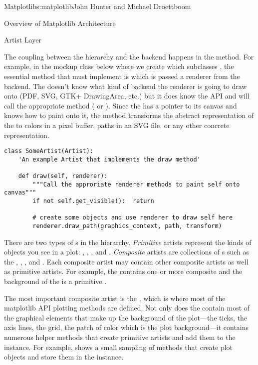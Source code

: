 \begin{aosachapter}{Matplotlib}{s:matplotlib}{John Hunter and Michael Droettboom}
\begin{aosasect1}{Overview of Matplotlib Architecture}
\begin{aosasect2}{Artist Layer}


The coupling between the  hierarchy and the backend
happens in the  method.  For example, in the mockup class below
where we create  which subclasses , the
essential method that  must implement is 
which is passed a renderer from the backend.
The  doesn't know what kind of backend the renderer is going to
draw onto (PDF, SVG, GTK+ DrawingArea, etc.) but it does know the
 API and will call the appropriate method
( or ).  Since the  has
a pointer to its canvas and knows how to paint onto it, the 
method transforms the abstract representation of the  to
colors in a pixel buffer, paths in an SVG file, or any other
concrete representation.

\begin{verbatim}
class SomeArtist(Artist):
    'An example Artist that implements the draw method'

    def draw(self, renderer):
        """Call the approriate renderer methods to paint self onto canvas"""
        if not self.get_visible():  return

        # create some objects and use renderer to draw self here
        renderer.draw_path(graphics_context, path, transform)

\end{verbatim}

There are two types of s in the
hierarchy. \emph{Primitive} artists represent the kinds of objects you
see in a plot: , , , and
.  \emph{Composite} artists are collections of
s such as the , , , and
.  Each composite artist may contain other composite
artists as well as primitive artists. For example, the  contains
one or more composite  and the background of the
 is a primitive .

The most important composite artist is the , which is where most
of the matplotlib API plotting methods are defined.  Not only does the
 contain most of the graphical elements that make up the
background of the plot---the ticks, the axis lines, the grid, the
patch of color which is the plot background---it contains numerous
helper methods that create primitive artists and add them to the 
instance.  For example,  shows
a small sampling of  methods that create plot objects and store
them in the  instance.


\end{aosasect2}
\end{aosasect1}
\end{aosachapter}
